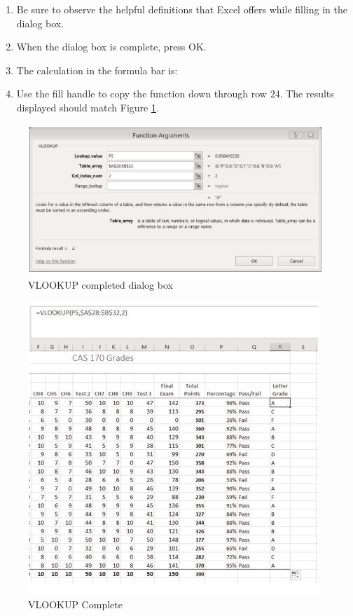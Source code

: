 \begin{enumerate}[resume]
	\item Be sure to observe the helpful definitions that Excel offers while filling in the  dialog box.
	\item When the dialog box is complete, press OK.
	\item The calculation in the formula bar is: 
	\item Use the fill handle to copy the function down through row $ 24 $. The results displayed should match Figure \ref{03:fig13}.
\end{enumerate}

\begin{figure}[H]
	\centering
	\includegraphics[width=\maxwidth{.95\linewidth}]{gfx/ch03_fig13}
	\caption{VLOOKUP completed dialog box}
	\label{03:fig13}
\end{figure}

\begin{figure}[H]
	\centering
	\includegraphics[width=\maxwidth{.95\linewidth}]{gfx/ch03_fig14}
	\caption{VLOOKUP Complete}
	\label{03:fig14}
\end{figure}

